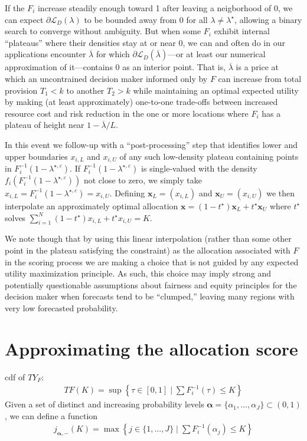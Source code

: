 \documentclass{article}
\begin{document}
If the $F_i$ increase steadily enough toward 1 after leaving a neigborhood of 0, we can expect $\partial \mathcal{L}_D(\lambda)$ to be bounded away from 0 for all $\lambda \neq \lambda^{\star}$, allowing a binary search to converge without ambiguity.  But when some $F_i$ exhibit internal ``plateaus'' where their densities stay at or near 0, we can and often do in our applications encounter $\overline{\lambda}$ for which $\partial \mathcal{L}_D(\overline{\lambda})$---or at least our numerical approximation of it---contains 0 as an interior point. That is, $\overline{\lambda}$ is a price at which an uncontrained decision maker informed only by $F$ can increase from total provision $T_1<k$ to another $T_2>k$ while maintaining an optimal expected utility by making (at least approximately) one-to-one trade-offs between increased resource cost and risk reduction in the one or more locations where $F_i$ has a plateau of height near $1-\overline{\lambda}/L$. 

In this event we follow-up with a ``post-processing'' step that identifies lower and upper boundaries $x_{i,L}$ and $x_{i,U}$ of any
such low-density plateau containing points in $F_{i}^{-1}(1-\lambda^{\star, \varepsilon})$. If $F_{i}^{-1}(1-\lambda^{\star, \varepsilon})$ is single-valued 
with the density $f_i(F_{i}^{-1}(1-\lambda^{\star, \varepsilon}))$ not close to zero, we simply take $x_{i,L} = F_{i}^{-1}(1-\lambda^{\star, \varepsilon}) = x_{i,U}$. Defining $\mathbf{x}_L = (x_{i,L})$ and $\mathbf{x}_U = (x_{i,U})$ we then interpolate an approximately optimal allocation 
$\mathbf{x} = (1-t^{\star})\mathbf{x}_L + t^{\star}\mathbf{x}_U$ where $t^{\star}$ solves 
$\sum_{i=1}^{N }(1-t^{\star})x_{i,L} + t^{\star}x_{i,U} = K$.

We note though that by using this linear interpolation (rather than some other point in the plateau satisfying the constraint) as the allocation associated with $F$ in the scoring process we are making a choice that is not
guided by any expected utility maximization principle. As such, this choice may imply strong and potentially questionable assumptions about fairness and
equity principles for the decision maker when forecasts tend to be ``clumped,'' leaving many regions with very low forecasted probability.

\section{Approximating the allocation score}

cdf of $TY_F$:
\begin{align}
TF(K) = \sup \left\{\tau \in [0,1] \mid \sum F_i^{-1}(\tau) \leq K \right\} 
\end{align}
Given a set of distinct and increasing probability levels $\boldsymbol{\alpha} = \{\alpha_1,\ldots,\alpha_J\} \subset (0,1)$, we can define a function
\begin{align}
j_{\boldsymbol{\alpha},-}(K) = \max \left\{j \in \{1,\ldots,J\} \mid \sum F_i^{-1}(\alpha_j) \leq K \right\} 
\end{align}
\end{document}
